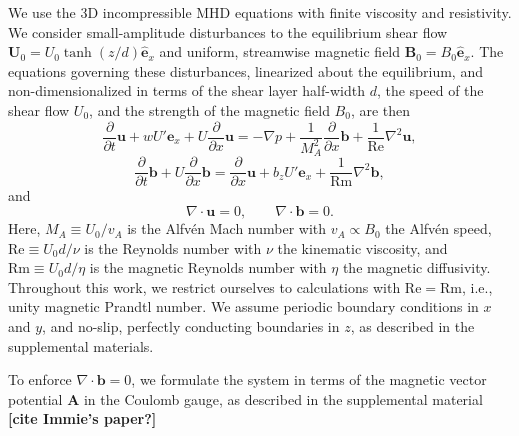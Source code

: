 \documentclass[%
 reprint,
 amsmath,amssymb,
 aps,
]{revtex4-2}
\begin{document}
We use the 3D incompressible MHD equations with finite viscosity and resistivity. We consider small-amplitude disturbances to the equilibrium shear flow $\mathbf{U}_0 = U_0 \tanh(z/d) \hat{\mathbf{e}}_x$ and uniform, streamwise magnetic field $\mathbf{B}_0 = B_0 \hat{\mathbf{e}}_x$. The equations governing these disturbances, linearized about the equilibrium, and non-dimensionalized in terms of the shear layer half-width $d$, the speed of the shear flow $U_0$, and the strength of the magnetic field $B_0$, are then
\begin{equation} \label{eq:lin-momentum}
\frac{\partial}{\partial t} \mathbf{u} + wU' \mathbf{e}_x + U \frac{\partial}{\partial x}\mathbf{u} = - \nabla p + \frac{1}{M_A^2} \frac{\partial}{\partial x}\mathbf{b} + \frac{1}{\mathrm{Re}} \nabla^2 \mathbf{u},
\end{equation}
\begin{equation} \label{eq:lin-induction}
\frac{\partial}{\partial t} \mathbf{b} + U \frac{\partial}{\partial x}\mathbf{b} = \frac{\partial}{\partial x}\mathbf{u} + b_z U' \mathbf{e}_x + \frac{1}{\mathrm{Rm}} \nabla^2 \mathbf{b},
\end{equation}
and
\begin{equation}
\nabla \cdot \mathbf{u} = 0, \qquad \nabla \cdot \mathbf{b} = 0.
\end{equation}
Here, $M_A \equiv U_0/v_A$ is the Alfv\'{e}n Mach number with $v_A \propto B_0$ the Alfv\'{e}n speed, $\mathrm{Re} \equiv U_0 d / \nu$ is the Reynolds number with $\nu$ the kinematic viscosity, and $\mathrm{Rm} \equiv U_0 d / \eta$ is the magnetic Reynolds number with $\eta$ the magnetic diffusivity. Throughout this work, we restrict ourselves to calculations with $\mathrm{Re} = \mathrm{Rm}$, i.e., unity magnetic Prandtl number.
We assume periodic boundary conditions in $x$ and $y$, and no-slip, perfectly conducting boundaries in $z$, as described in the supplemental materials. 

To enforce $\nabla \cdot \mathbf{b} = 0$, we formulate the system in terms of the magnetic vector potential $\mathbf{A}$ in the Coulomb gauge, as described in the supplemental material \textbf{[cite Immie's paper?]}
\end{document}
